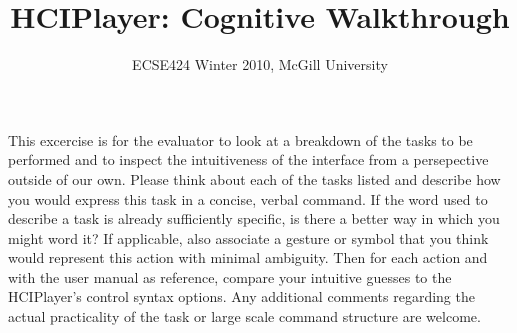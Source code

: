 \documentclass[10pt,letterpaper]{article}
\begin{document}
\title{HCIPlayer: Cognitive Walkthrough}
\author{ECSE424 Winter 2010, McGill University}
\renewcommand{\today}{Updated: Monday, March 8th, 2010}
\maketitle

This excercise is for the evaluator to look at a breakdown of the tasks to be performed and to inspect the intuitiveness of the interface from a persepective outside of our own. Please think about each of the tasks listed and describe how you would express this task in a concise, verbal command. If the word used to describe a task is already sufficiently specific, is there a better way in which you might word it? If applicable, also associate a gesture or symbol that you think would represent this action with minimal ambiguity. Then for each action and with the user manual as reference, compare your intuitive guesses to the HCIPlayer's control syntax options. Any additional comments regarding the actual practicality of the task or large scale command structure are welcome.

\vspace{1.5cm}
\end{document}
